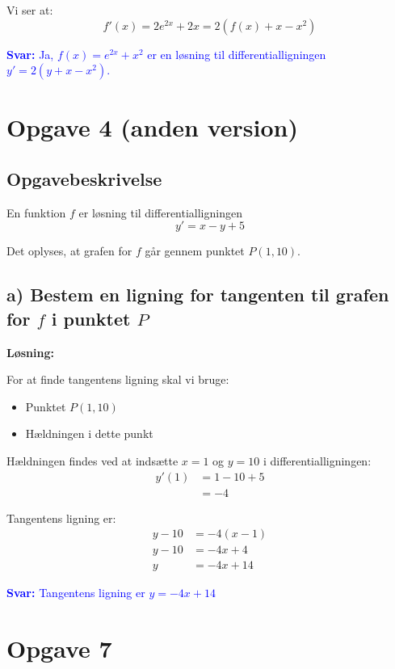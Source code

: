 \documentclass[a4paper,12pt]{article}
\begin{document}
Vi ser at:
\[
f'(x) = 2e^{2x} + 2x = 2(f(x) + x - x^2)
\]

\textcolor{blue}{\textbf{Svar:} Ja, $f(x) = e^{2x} + x^2$ er en løsning til differentialligningen $y' = 2(y + x - x^2)$.}

\newpage

\section*{Opgave 4 (anden version)}

\subsection*{Opgavebeskrivelse}
En funktion $f$ er løsning til differentialligningen
\[
y' = x - y + 5
\]

Det oplyses, at grafen for $f$ går gennem punktet $P(1, 10)$.

\subsection*{a) Bestem en ligning for tangenten til grafen for $f$ i punktet $P$}

\textbf{Løsning:}

For at finde tangentens ligning skal vi bruge:
\begin{itemize}
    \item Punktet $P(1, 10)$
    \item Hældningen i dette punkt
\end{itemize}

Hældningen findes ved at indsætte $x = 1$ og $y = 10$ i differentialligningen:
\begin{align*}
y'(1) &= 1 - 10 + 5 \\
&= -4
\end{align*}

Tangentens ligning er:
\begin{align*}
y - 10 &= -4(x - 1) \\
y - 10 &= -4x + 4 \\
y &= -4x + 14
\end{align*}

\textcolor{blue}{\textbf{Svar:} Tangentens ligning er $y = -4x + 14$}

\newpage

\section*{Opgave 7}
\end{document}
